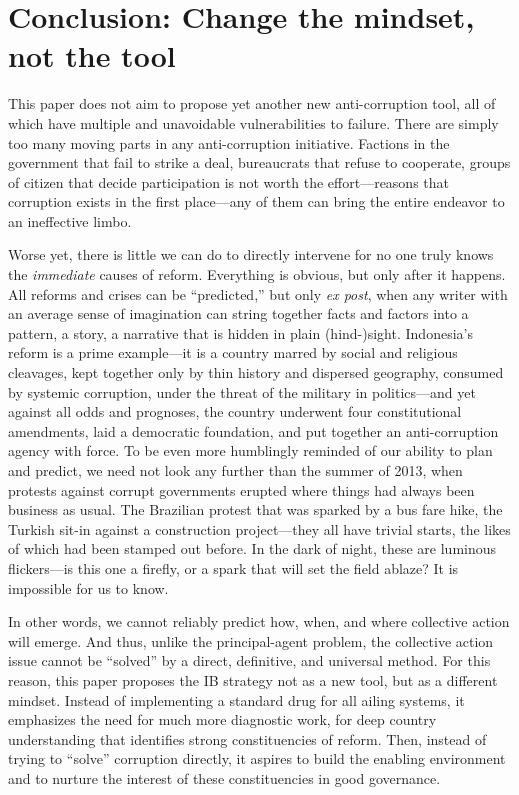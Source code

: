 \documentclass[12pt]{article}
\begin{document}
\section{Conclusion: Change the mindset, not the tool} \label{sec:conclusion}

This paper does not aim to propose yet another new anti-corruption tool, all of which have multiple and unavoidable vulnerabilities to failure. There are simply too many moving parts in any anti-corruption initiative. Factions in the government that fail to strike a deal, bureaucrats that refuse to cooperate, groups of citizen that decide participation is not worth the effort---reasons that corruption exists in the first place---any of them can bring the entire endeavor to an ineffective limbo.

Worse yet, there is little we can do to directly intervene for no one truly knows the \textit{immediate} causes of reform. Everything is obvious, but only after it happens. All reforms and crises can be ``predicted,'' but only \textit{ex post}, when any writer with an average sense of imagination can string together facts and factors into a pattern, a story, a narrative that is hidden in plain (hind-)sight. Indonesia's reform is a prime example---it is a country marred by social and religious cleavages, kept together only by thin history and dispersed geography, consumed by systemic corruption, under the threat of the military in politics---and yet against all odds and prognoses, the country underwent four constitutional amendments, laid a democratic foundation, and put together an anti-corruption agency with force. To be even more humblingly reminded of our ability to plan and predict, we need not look any further than the summer of 2013, when protests against corrupt governments erupted where things had always been business as usual. The Brazilian protest that was sparked by a bus fare hike, the Turkish sit-in against a construction project---they all have trivial starts, the likes of which had been stamped out before. In the dark of night, these are luminous flickers---is this one a firefly, or a spark that will set the field ablaze? It is impossible for us to know.

In other words, we cannot reliably predict how, when, and where collective action will emerge. And thus, unlike the principal-agent problem, the collective action issue cannot be ``solved'' by a direct, definitive, and universal method. For this reason, this paper proposes the IB strategy not as a new tool, but as a different mindset. Instead of implementing a standard drug for all ailing systems, it emphasizes the need for much more diagnostic work, for deep country understanding that identifies strong constituencies of reform. Then, instead of trying to ``solve'' corruption directly, it aspires to build the enabling environment and to nurture the interest of these constituencies in good governance.
\end{document}
